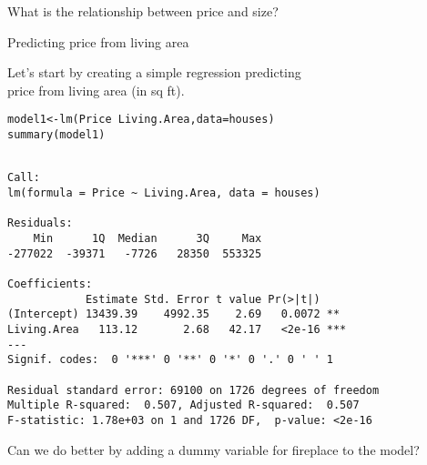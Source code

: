 \documentclass{beamer}\usepackage[]{graphicx}\usepackage[]{color}
\makeatletter
\newcommand{\hlopt}[1]{\textcolor[rgb]{1,0.894,0.769}{#1}}%
\newcommand{\hlstd}[1]{\textcolor[rgb]{1,0.894,0.769}{#1}}%
\newcommand{\hlkwb}[1]{\textcolor[rgb]{0.804,0.776,0.451}{#1}}%
\newcommand{\hlkwc}[1]{\textcolor[rgb]{0.78,0.941,0.545}{#1}}%
\newcommand{\hlkwd}[1]{\textcolor[rgb]{1,0.78,0.769}{#1}}%
\newenvironment{kframe}{%
 \def\at@end@of@kframe{}%
 \ifinner\ifhmode%
  \def\at@end@of@kframe{\end{minipage}}%
  \begin{minipage}{\columnwidth}%
 \fi\fi%
 \def\FrameCommand##1{\hskip\@totalleftmargin \hskip-\fboxsep
 \colorbox{shadecolor}{##1}\hskip-\fboxsep
     \hskip-\linewidth \hskip-\@totalleftmargin \hskip\columnwidth}%
 \MakeFramed {\advance\hsize-\width
   \@totalleftmargin\z@ \linewidth\hsize
   \@setminipage}}%
 {\par\unskip\endMakeFramed%
 \at@end@of@kframe}
\newenvironment{knitrout}{}{} %
\makeatother
\begin{document}
\begin{darkframes}
    \begin{frame}{What is the relationship between price and size?}
\begin{knitrout}


\end{knitrout}
    \end{frame}

    \begin{frame}{Predicting price from living area}
      \begin{center}
        Let's start by creating a simple regression predicting \\
        price from living area (in sq ft).
      \end{center}
    \end{frame}

    \begin{frame}[fragile]
      \fontsize{8}{8}\selectfont
\begin{knitrout}
\begin{kframe}
\begin{alltt}
\hlstd{model1} \hlkwb{<-} \hlkwd{lm}\hlstd{(Price} \hlopt{~} \hlstd{Living.Area,} \hlkwc{data}\hlstd{=houses)}
\hlkwd{summary}\hlstd{(model1)}
\end{alltt}
\begin{verbatim}

Call:
lm(formula = Price ~ Living.Area, data = houses)

Residuals:
    Min      1Q  Median      3Q     Max 
-277022  -39371   -7726   28350  553325 

Coefficients:
            Estimate Std. Error t value Pr(>|t|)    
(Intercept) 13439.39    4992.35    2.69   0.0072 ** 
Living.Area   113.12       2.68   42.17   <2e-16 ***
---
Signif. codes:  0 '***' 0 '**' 0 '*' 0 '.' 0 ' ' 1

Residual standard error: 69100 on 1726 degrees of freedom
Multiple R-squared:  0.507,	Adjusted R-squared:  0.507 
F-statistic: 1.78e+03 on 1 and 1726 DF,  p-value: <2e-16
\end{verbatim}
\end{kframe}
\end{knitrout}
    \end{frame}

    \begin{frame}
      \begin{center}
        Can we do better by adding a dummy variable for fireplace to the model?
      \end{center}
    \end{frame}


\end{darkframes}
\end{document}
